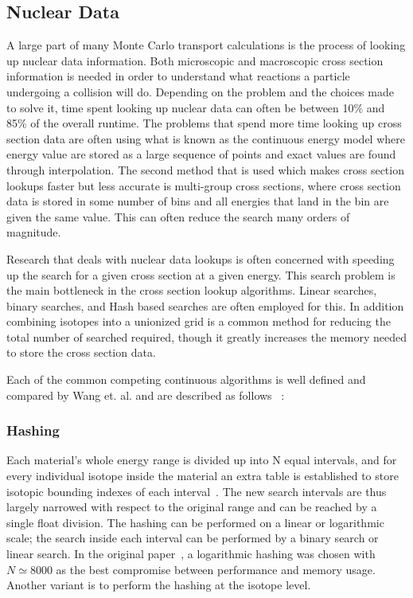 \subsection{\textbf{Nuclear Data}}

A large part of many Monte Carlo transport calculations is the process of looking up nuclear data information.
%
Both microscopic and macroscopic cross section information is needed in order to understand what reactions a particle undergoing a collision will do.
%
Depending on the problem and the choices made to solve it, time spent looking up nuclear data can often be between 10\% and 85\% of the overall runtime.
%
The problems that spend more time looking up cross section data are often using what is known as the continuous energy model where energy value are stored as a large sequence of points and exact values are found through interpolation.
%
The second method that is used which makes cross section lookups faster but less accurate is multi-group cross sections, where cross section data is stored in some number of bins and all energies that land in the bin are given the same value.
%
This can often reduce the search many orders of magnitude.
%

%
Research that deals with nuclear data lookups is often concerned with speeding up the search for a given cross section at a given energy.
%
This search problem is the main bottleneck in the cross section lookup algorithms.
%
Linear searches, binary searches, and Hash based searches are often employed for this.
%
In addition combining isotopes into a unionized grid is a common method for reducing the total number of searched required, though it greatly increases the memory needed to store the cross section data.
%

Each of the common competing continuous algorithms is well defined and compared by Wang et. al. and are described as follows ~\cite{wang2016competing}:
%
\subsubsection*{ \textbf{Hashing} } Each material's whole energy range is divided up into N equal intervals, and for every individual isotope inside the material an extra table is established to store isotopic bounding indexes of each interval~\cite{brown2014new}. The new search intervals are thus largely narrowed with respect to the original range and can be reached by a single float division. The hashing can be performed on a linear or logarithmic scale; the search inside each interval can be performed by a binary search or linear search. In the original paper~\cite{brown2014new}, a logarithmic hashing was chosen with $ N \simeq 8000 $ as the best compromise between performance and memory usage. Another variant is to perform the hashing at the isotope level.
%
